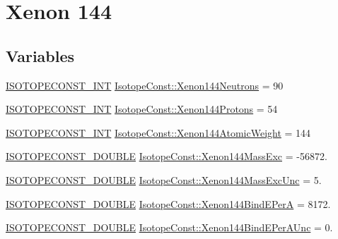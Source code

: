 \hypertarget{group___isotope_const-_xenon-_xe144}{}\section{Xenon 144}
\label{group___isotope_const-_xenon-_xe144}
\subsection*{Variables}
\begin{DoxyCompactItemize}
\item 
\mbox{\hyperlink{group___isotope_const-_macros_ga5f18360b3e99483a35c32d789e62621c}{I\+S\+O\+T\+O\+P\+E\+C\+O\+N\+S\+T\+\_\+\+I\+NT}} \mbox{\hyperlink{group___isotope_const-_xenon-_xe144_ga4fa02fe61d5c8ff0f0368108ed01397b}{Isotope\+Const\+::\+Xenon144\+Neutrons}} = 90
\item 
\mbox{\hyperlink{group___isotope_const-_macros_ga5f18360b3e99483a35c32d789e62621c}{I\+S\+O\+T\+O\+P\+E\+C\+O\+N\+S\+T\+\_\+\+I\+NT}} \mbox{\hyperlink{group___isotope_const-_xenon-_xe144_gae042b3b44486ff54858291e520a905ed}{Isotope\+Const\+::\+Xenon144\+Protons}} = 54
\item 
\mbox{\hyperlink{group___isotope_const-_macros_ga5f18360b3e99483a35c32d789e62621c}{I\+S\+O\+T\+O\+P\+E\+C\+O\+N\+S\+T\+\_\+\+I\+NT}} \mbox{\hyperlink{group___isotope_const-_xenon-_xe144_ga891e85c32a94b612c25a84b58447761b}{Isotope\+Const\+::\+Xenon144\+Atomic\+Weight}} = 144
\item 
\mbox{\hyperlink{group___isotope_const-_macros_ga8f45a7272ce02c0b4c65c44636ed719a}{I\+S\+O\+T\+O\+P\+E\+C\+O\+N\+S\+T\+\_\+\+D\+O\+U\+B\+LE}} \mbox{\hyperlink{group___isotope_const-_xenon-_xe144_gada4f16595ff7910b027d025801c5f60a}{Isotope\+Const\+::\+Xenon144\+Mass\+Exc}} = -\/56872.
\item 
\mbox{\hyperlink{group___isotope_const-_macros_ga8f45a7272ce02c0b4c65c44636ed719a}{I\+S\+O\+T\+O\+P\+E\+C\+O\+N\+S\+T\+\_\+\+D\+O\+U\+B\+LE}} \mbox{\hyperlink{group___isotope_const-_xenon-_xe144_ga054359a0e3d5f179b94a5c48fd6b80b9}{Isotope\+Const\+::\+Xenon144\+Mass\+Exc\+Unc}} = 5.
\item 
\mbox{\hyperlink{group___isotope_const-_macros_ga8f45a7272ce02c0b4c65c44636ed719a}{I\+S\+O\+T\+O\+P\+E\+C\+O\+N\+S\+T\+\_\+\+D\+O\+U\+B\+LE}} \mbox{\hyperlink{group___isotope_const-_xenon-_xe144_ga28ff6f9c655135c6490641d4bf4db057}{Isotope\+Const\+::\+Xenon144\+Bind\+E\+PerA}} = 8172.
\item 
\mbox{\hyperlink{group___isotope_const-_macros_ga8f45a7272ce02c0b4c65c44636ed719a}{I\+S\+O\+T\+O\+P\+E\+C\+O\+N\+S\+T\+\_\+\+D\+O\+U\+B\+LE}} \mbox{\hyperlink{group___isotope_const-_xenon-_xe144_gae2419a7418bac4545229550500ef8965}{Isotope\+Const\+::\+Xenon144\+Bind\+E\+Per\+A\+Unc}} = 0.

\end{DoxyCompactItemize}
